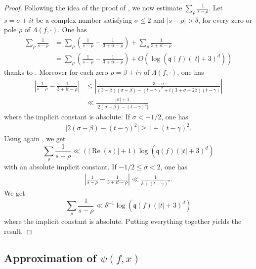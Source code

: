\documentclass[a4paper,10pt]{amsart}
\theoremstyle{plain}
\theoremstyle{definition}
\begin{document}
\begin{proof}
Following the idea of the proof of \cite[(5.28)]{IK}, 
we now estimate $\sum_{\rho}\frac{1}{s-\rho}$.
Let $s=\sigma + it$ be a complex number satisfying $\sigma\leq 2$ and $\lvert s - \rho\rvert > \delta$, for every zero or pole $\rho$ of $\Lambda(f,\cdot)$.
One has
\begin{align*}
\sum_{\rho}\frac{1}{s-\rho} &= \sum_{\rho}\left(\frac{1}{s-\rho} - \frac{1}{3+it-\rho} \right) 
+ \sum_{\rho} \frac{1}{3+it-\rho} \\
& = \sum_{\rho}\left(\frac{1}{s-\rho} - \frac{1}{3+it-\rho} \right) 
+ O(\log(\mathfrak{q}(f)(\lvert t \rvert + 3)^{d}))
\end{align*}
thanks to \cite[(5.32)]{IK}.
Moreover for each zero $\rho=\beta + i\gamma$ of $\Lambda(f,\cdot)$, one has
\begin{align*}
\left\lvert \frac{1}{s-\rho} - \frac{1}{3+it-\rho} \right\rvert
&\leq \left\lvert \frac{3 - \sigma}{(3-\beta)(\sigma-\beta) - (t-\gamma)^{2} + i (3+\sigma -2\beta)(t-\gamma)} \right\rvert \\
&\ll \frac{\lvert\sigma\rvert+1}{\lvert 2(\sigma - \beta)  - (t-\gamma)^{2}\rvert}
\end{align*}
where the implicit constant is absolute.
If $\sigma <-1/2$, one has
\begin{align*}
\lvert 2(\sigma - \beta)  - (t-\gamma)^{2}\rvert \geq 1 + (t-\gamma)^{2}.
\end{align*}
Using again \cite[(5.32)]{IK}, 
we get
$$\sum_{\rho}\frac{1}{s-\rho}\ll (\lvert\operatorname{Re}(s)\rvert +1)\log(\mathfrak{q}(f)(\lvert t \rvert + 3)^{d})$$
with an absolute implicit constant.
If $-1/2\leq \sigma <2$, one has 
\begin{align*}
\left\lvert \frac{1}{s-\rho} - \frac{1}{3+it-\rho} \right\rvert \ll  \frac{1}{ \delta +  (t-\gamma)^{2}}.
\end{align*}
We get 
$$\sum_{\rho}\frac{1}{s-\rho}\ll \delta^{-1}\log(\mathfrak{q}(f)(\lvert t \rvert + 3)^{d})$$
where the implicit constant is absolute.
Putting everything together yields the result.

\end{proof}

\subsection{Approximation of $\psi(f,x)$}\label{Subsec_Approx1}
\end{document}
